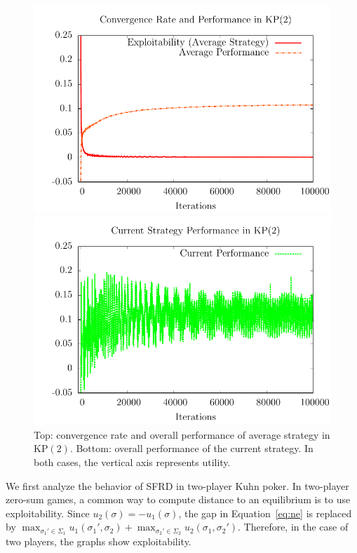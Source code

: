 \documentclass{aamas2014}
\begin{document}
\begin{figure}[t]
\begin{center}
\hspace{-0.5cm}\includegraphics[scale=0.7]{figs/sfrd2-conv} 

\hspace{-0.5cm}\includegraphics[scale=0.7]{figs/sfrd2-curperf}
\end{center}
\caption{Top: convergence rate and overall performance of average strategy in KP$(2)$. Bottom: overall performance
of the current strategy. In both cases, the vertical axis represents utility. \label{fig:sfrd2-conv}}
\end{figure}

We first analyze the behavior of SFRD in two-player Kuhn poker. 
In two-player zero-sum games, 
a common way to compute distance to an equilibrium is to use exploitability. Since $u_2(\sigma) = -u_1(\sigma)$, 
the gap in Equation~\ref{eq:ne} is replaced by 
$\max_{\sigma_1' \in \Sigma_1} u_1(\sigma_1', \sigma_2) + \max_{\sigma_2' \in \Sigma_2} u_2(\sigma_1, \sigma_2')$. 
Therefore, in the case of two players, the graphs show exploitability. 
\end{document}
